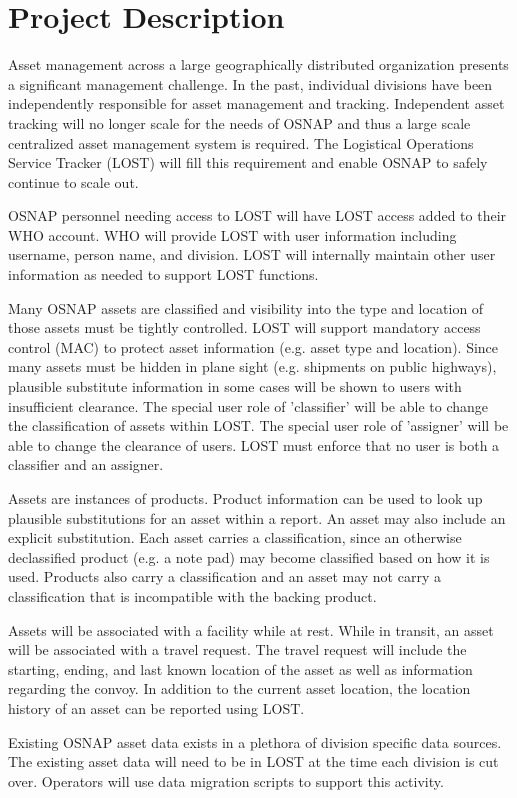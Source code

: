 \chapter*{Project Description}
Asset management across a large geographically distributed organization presents a significant management challenge. In the past, individual divisions have been independently responsible for asset management and tracking. Independent asset tracking will no longer scale for the needs of OSNAP and thus a large scale centralized asset management system is required. The Logistical Operations Service Tracker (LOST) will fill this requirement and enable OSNAP to safely continue to scale out.

OSNAP personnel needing access to LOST will have LOST access added to their WHO account. WHO will provide LOST with user information including username, person name, and division. LOST will internally maintain other user information as needed to support LOST functions.

Many OSNAP assets are classified and visibility into the type and location of those assets must be tightly controlled. LOST will support mandatory access control (MAC) to protect asset information (e.g. asset type and location). Since many assets must be hidden in plane sight (e.g. shipments on public highways), plausible substitute information in some cases will be shown to users with insufficient clearance. The special user role of 'classifier' will be able to change the classification of assets within LOST. The special user role of 'assigner' will be able to change the clearance of users. LOST must enforce that no user is both a classifier and an assigner.

Assets are instances of products. Product information can be used to look up plausible substitutions for an asset within a report. An asset may also include an explicit substitution. Each asset carries a classification, since an otherwise declassified product (e.g. a note pad) may become classified based on how it is used. Products also carry a classification and an asset may not carry a classification that is incompatible with the backing product.

Assets will be associated with a facility while at rest. While in transit, an asset will be associated with a travel request. The travel request will include the starting, ending, and last known location of the asset as well as information regarding the convoy. In addition to the current asset location, the location history of an asset can be reported using LOST.


Existing OSNAP asset data exists in a plethora of division specific data sources. The existing asset data will need to be in LOST at the time each division is cut over. Operators will use data migration scripts to support this activity.